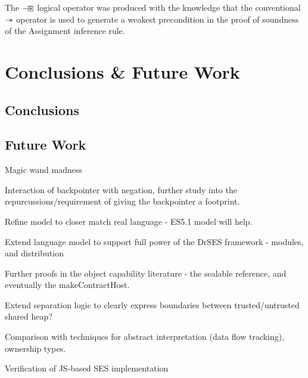 \documentclass[a4paper,notitlepage]{report}
\begin{document}
The $\mathbin{-\mkern-3mu \boxast}$ logical operator was produced with the knowledge that the
conventional $\mathbin{-\mkern-6mu *}$ operator is used to generate a weakest precondition in the
proof of soundness of the Assignment inference rule.



\chapter{Conclusions \& Future Work}
\section{Conclusions}

\section{Future Work}
Magic wand madness

Interaction of backpointer with negation, further study into the
repurcussions/requirement of giving the backpointer a footprint.

Refine model to closer match real language - ES5.1 model will help.

Extend language model to support full power of the DrSES framework - modules,
and distribution

Further proofs in the object capability literature - the sealable reference, and
eventually the makeContractHost.

Extend separation logic to clearly express boundaries between trusted/untrusted
shared heap?

Comparison with techniques for abstract interpretation (data flow tracking),
ownership types.

Verification of JS-based SES implementation




\appendix
\end{document}
